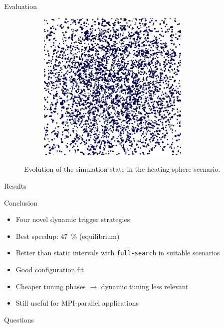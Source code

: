 \begin{frame}[c]{Evaluation}{}
{\begin{figure}[htpb]
\begin{subfigure}{.25\textwidth}
		\end{subfigure}%
		\begin{subfigure}{.25\textwidth}
			\vspace*{0.1\textwidth}
			\centering
			\includegraphics[width=0.8\textwidth]{heating-sphere/render/t60000.png}
			\vspace*{0.1\textwidth}
		\end{subfigure}%
				\vspace{-0.3cm}
		\caption{Evolution of the simulation state in the heating-sphere scenario.}
	\end{figure}
}
\end{frame}

\begin{frame}[c]{Results}{}
\end{frame}

\begin{frame}[c]{Conclusion}{}
	\begin{itemize}
		\item Four novel dynamic trigger strategies
		\item Best speedup: \qty{47}{\percent} (equilibrium)
		\item Better than static intervals with \texttt{full-search} in suitable scenarios
		\item Good configuration fit
		\item Cheaper tuning phases $\rightarrow$ dynamic tuning less relevant
		\item Still useful for MPI-parallel applications
	\end{itemize}
\end{frame}


\begin{frame}[c]{}{}
	\begin{center}
		\LARGE Questions
	\end{center}
\end{frame}

\maketitle


